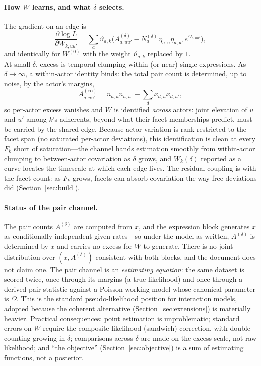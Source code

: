 \documentclass[11pt]{article}
\newcommand{\1}{\mathbb{1}}
\begin{document}
\paragraph{How $W$ learns, and what $\delta$ selects.} The gradient on an edge is
\[
  \frac{\partial\log L}{\partial W_{k,uu'}}=\sum_a\vartheta_{a,k}\Big(A^{(\delta)}_{a,uu'}-N^{(\delta)}_a\,\eta_{a,u}\eta_{a,u'}\,e^{\Omega_{a,uu'}}\Big),
\]
and identically for $W^{(0)}$ with the weight $\vartheta_{a,k}$ replaced by $1$.
\[
\]
At small $\delta$, excess is temporal clumping within (or near) single expressions. As $\delta\to\infty$, a within-actor identity binds: the total pair count is determined, up to noise, by the actor's margins,
\[
  A^{(\infty)}_{a,uu'}=n_{a,u}n_{a,u'}-\textstyle\sum_d x_{d,u}x_{d,u'},
\]
so per-actor excess vanishes and $W$ is identified \emph{across} actors: joint elevation of $u$ and $u'$ among $k$'s adherents, beyond what their facet memberships predict, must be carried by the shared edge. Because actor variation is rank-restricted to the facet span (no saturated per-actor deviations), this identification is clean at every $F_k$ short of saturation---the channel hands estimation smoothly from within-actor clumping to between-actor covariation as $\delta$ grows, and $W_k(\delta)$ reported as a curve locates the timescale at which each edge lives. The residual coupling is with the facet count: as $F_k$ grows, facets can absorb covariation the way free deviations did (Section~\ref{sec:build}).

\paragraph{Status of the pair channel.} The pair counts $A^{(\delta)}$ are computed from $x$, and the expression block generates $x$ as conditionally independent given rates---so under the model as written, $A^{(\delta)}$ is determined by $x$ and carries no excess for $W$ to generate. There is no joint distribution over $(x,A^{(\delta)})$ consistent with both blocks, and the document does not claim one. The pair channel is an \emph{estimating equation}: the same dataset is scored twice, once through its margins (a true likelihood) and once through a derived pair statistic against a Poisson working model whose canonical parameter is $\Omega$. This is the standard pseudo-likelihood position for interaction models, adopted because the coherent alternative (Section~\ref{sec:extensions}) is materially heavier. Practical consequences: point estimation is unproblematic; standard errors on $W$ require the composite-likelihood (sandwich) correction, with double-counting growing in $\delta$; comparisons across $\delta$ are made on the excess scale, not raw likelihood; and ``the objective'' (Section~\ref{sec:objective}) is a sum of estimating functions, not a posterior.
\end{document}
